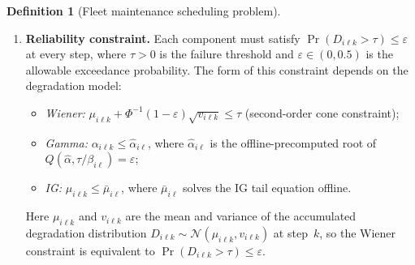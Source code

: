 \documentclass[11pt,a4paper]{article}
\theoremstyle{plain}
\theoremstyle{definition}
\newtheorem{definition}[theorem]{Definition}
\theoremstyle{remark}
\begin{document}
\begin{definition}[Fleet maintenance scheduling problem]
\begin{enumerate}[nosep,leftmargin=2em]
\begin{equation}
      v_{i\ell k} = \begin{cases}
        v_{i\ell,k-1} + \delta v_{i\ell k}
          & \text{if } x^m_{i\ell k} = 0 \text{ and } x^r_{i\ell k} = 0, \\[3pt]
        v_{i\ell,k-1}
          & \text{if } x^m_{i\ell k} = 1
          \quad\text{(variance unchanged by imperfect repair)}, \\[3pt]
        v^{\mathrm{new}}_{i\ell}
          & \text{if } x^r_{i\ell k} = 1
          \quad\text{(reset to new-component value)},
      \end{cases}
    \end{equation}
    where $\delta v_{i\ell k} = \sum_{j=1}^{M} x_{ijk}\,v^{\mathrm{inc}}_{ij\ell,k}$
    is the mission-induced variance increment.

  \item \textbf{Reliability constraint.} Each component must satisfy
    $\Pr(D_{i\ell k} > \tau) \le \varepsilon$ at every step, where $\tau > 0$ is the
    failure threshold and $\varepsilon \in (0, 0.5)$ is the allowable exceedance
    probability. The form of this constraint depends on the degradation model:
    \begin{itemize}[nosep]
      \item \emph{Wiener:}
            $\mu_{i\ell k} + \Phi^{-1}(1-\varepsilon)\sqrt{v_{i\ell k}} \le \tau$
            (second-order cone constraint);
      \item \emph{Gamma:}
            $\alpha_{i\ell k} \le \hat{\alpha}_{i\ell}$, where $\hat{\alpha}_{i\ell}$
            is the offline-precomputed root of $Q(\hat{\alpha}, \tau/\beta_{i\ell}) = \varepsilon$;
      \item \emph{IG:}
            $\mu_{i\ell k} \le \bar{\mu}_{i\ell}$, where $\bar{\mu}_{i\ell}$ solves
            the IG tail equation offline.
    \end{itemize}
    Here $\mu_{i\ell k}$ and $v_{i\ell k}$ are the mean and variance of the
    accumulated degradation distribution $D_{i\ell k} \sim \mathcal{N}(\mu_{i\ell k}, v_{i\ell k})$
    at step~$k$, so the Wiener constraint is equivalent to
    $\Pr(D_{i\ell k} > \tau) \le \varepsilon$.


\end{enumerate}
\end{definition}
\end{document}
